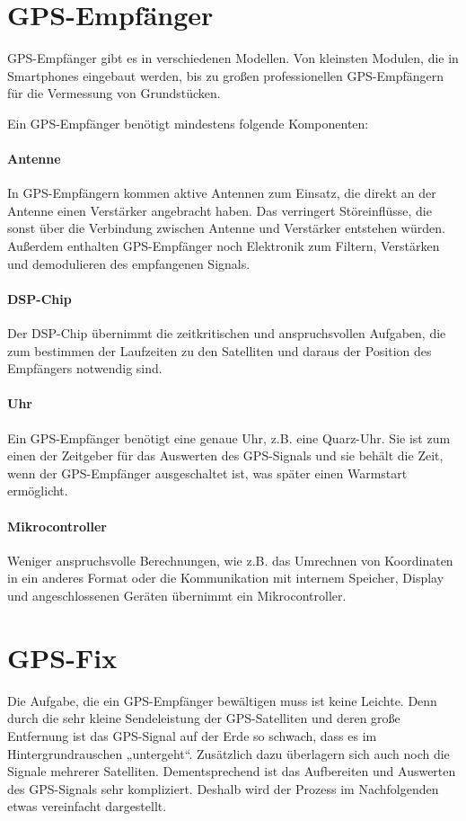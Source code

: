 \documentclass[12pt,a4paper]{scrartcl}
\begin{document}
\section{GPS-Empfänger}
GPS-Empfänger gibt es in verschiedenen Modellen. Von kleinsten Modulen, die in Smartphones eingebaut werden, bis zu großen professionellen GPS-Empfängern für die Vermessung von Grundstücken.

Ein GPS-Empfänger benötigt mindestens folgende Komponenten:

\paragraph{Antenne}
In GPS-Empfängern kommen aktive Antennen zum Einsatz, die direkt an der Antenne einen Verstärker angebracht haben. Das verringert Störeinflüsse, die sonst über die Verbindung zwischen Antenne und Verstärker entstehen würden. Außerdem enthalten GPS-Empfänger noch Elektronik zum Filtern, Verstärken und demodulieren des empfangenen Signals.

\paragraph{DSP-Chip}
Der DSP-Chip übernimmt die zeitkritischen und anspruchsvollen Aufgaben, die zum bestimmen der Laufzeiten zu den Satelliten und daraus der Position des Empfängers notwendig sind.

\paragraph{Uhr}
Ein GPS-Empfänger benötigt eine genaue Uhr, z.B. eine Quarz-Uhr. Sie ist zum einen der Zeitgeber für das Auswerten des GPS-Signals und sie behält die Zeit, wenn der GPS-Empfänger ausgeschaltet ist, was später einen Warmstart ermöglicht.

\paragraph{Mikrocontroller}
Weniger anspruchsvolle Berechnungen, wie z.B. das Umrechnen von Koordinaten in ein anderes Format oder die Kommunikation mit internem Speicher, Display und angeschlossenen Geräten übernimmt ein Mikrocontroller.

\section{GPS-Fix}
Die Aufgabe, die ein GPS-Empfänger bewältigen muss ist keine Leichte.
Denn durch die sehr kleine Sendeleistung der GPS-Satelliten und deren große Entfernung ist das GPS-Signal auf der Erde so schwach, dass es im Hintergrundrauschen „untergeht“. Zusätzlich dazu überlagern sich auch noch die Signale mehrerer Satelliten. Dementsprechend ist das Aufbereiten und Auswerten des GPS-Signals sehr kompliziert. Deshalb wird der Prozess im Nachfolgenden etwas vereinfacht dargestellt.
\end{document}
